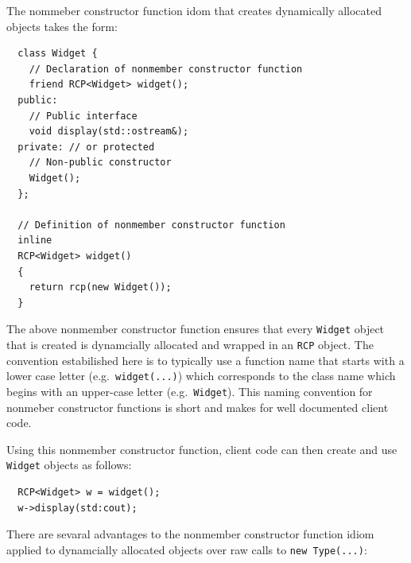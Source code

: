 \documentclass[pdf,ps2pdf,11pt]{SANDreport}
\begin{document}
The nommeber constructor function idom that creates dynamically allocated
objects takes the form:

{\small\begin{verbatim}
  class Widget {
    // Declaration of nonmember constructor function
    friend RCP<Widget> widget();
  public:
    // Public interface
    void display(std::ostream&);
  private: // or protected
    // Non-public constructor
    Widget();
  };

  // Definition of nonmember constructor function
  inline
  RCP<Widget> widget()
  {
    return rcp(new Widget());
  }
\end{verbatim}}

The above nonmember constructor function ensures that every {}\texttt{Widget}
object that is created is dynamcially allocated and wrapped in an
{}\texttt{RCP} object.  The convention estabilished here is to typically use a
function name that starts with a lower case letter (e.g.\
{}\texttt{widget(...)}) which corresponds to the class name which begins with
an upper-case letter (e.g.\ {}\texttt{Widget}).  This naming convention for
nonmeber constructor functions is short and makes for well documented client
code.

Using this nonmember constructor function, client code can then create and use
{}\texttt{Widget} objects as follows:

{\small\begin{verbatim}
  RCP<Widget> w = widget();
  w->display(std:cout);
\end{verbatim}}

There are sevaral advantages to the nonmember constructor function idiom
applied to dynamcially allocated objects over raw calls to {}\texttt{new
Type(...)}:
\end{document}

